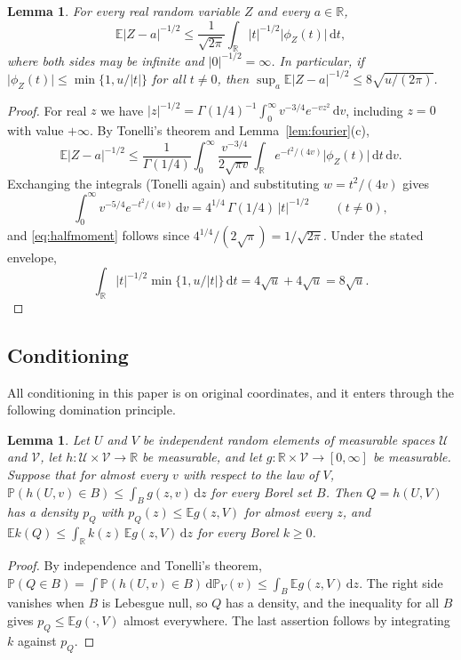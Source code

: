 \documentclass[11pt]{amsart}
\numberwithin{equation}{section}
\newtheorem{lemma}[theorem]{Lemma}
\theoremstyle{definition}
\theoremstyle{remark}
\newcommand{\R}{\mathbb R}
\newcommand{\E}{\mathbb E}
\newcommand{\PP}{\mathbb P}
\newcommand{\1}{\mathbf 1}
\newcommand{\dd}{\,\mathrm d}
\newcommand{\abs}[1]{\lvert #1\rvert}
\begin{document}
\begin{lemma}\label{lem:halfmoment}
For every real random variable $Z$ and every $a\in\R$,
\begin{equation}\label{eq:halfmoment}
\E\abs{Z-a}^{-1/2}\le\frac1{\sqrt{2\pi}}\int_\R\abs t^{-1/2}\abs{\phi_Z(t)}\dd t,
\end{equation}
where both sides may be infinite and $\abs0^{-1/2}=\infty$. In particular, if $\abs{\phi_Z(t)}\le\min\{1,u/\abs t\}$ for all $t\ne0$, then $\sup_a\E\abs{Z-a}^{-1/2}\le8\sqrt{u/(2\pi)}$.
\end{lemma}

\begin{proof}
For real $z$ we have $\abs z^{-1/2}=\Gamma(1/4)^{-1}\int_0^\infty v^{-3/4}e^{-vz^2}\dd v$, including $z=0$ with value $+\infty$. By Tonelli's theorem and Lemma~\ref{lem:fourier}(c),
\[
\E\abs{Z-a}^{-1/2}\le\frac{1}{\Gamma(1/4)}\int_0^\infty\frac{v^{-3/4}}{2\sqrt{\pi v}}\int_\R e^{-t^2/(4v)}\abs{\phi_Z(t)}\dd t\dd v .
\]
Exchanging the integrals (Tonelli again) and substituting $w=t^2/(4v)$ gives
\[
\int_0^\infty v^{-5/4}e^{-t^2/(4v)}\dd v=4^{1/4}\,\Gamma(1/4)\,\abs t^{-1/2}\qquad(t\ne0),
\]
and \eqref{eq:halfmoment} follows since $4^{1/4}/(2\sqrt\pi)=1/\sqrt{2\pi}$. Under the stated envelope,
\[
\int_\R\abs t^{-1/2}\min\{1,u/\abs t\}\dd t=4\sqrt u+4\sqrt u=8\sqrt u .
\]
\end{proof}

\subsection{Conditioning}
All conditioning in this paper is on original coordinates, and it enters through the following domination principle.

\begin{lemma}\label{lem:condition}
Let $U$ and $V$ be independent random elements of measurable spaces $\mathcal U$ and $\mathcal V$, let $h:\mathcal U\times\mathcal V\to\R$ be measurable, and let $g:\R\times\mathcal V\to[0,\infty]$ be measurable. Suppose that for almost every $v$ with respect to the law of $V$, $\PP(h(U,v)\in B)\le\int_Bg(z,v)\dd z$ for every Borel set $B$. Then $Q=h(U,V)$ has a density $p_Q$ with $p_Q(z)\le\E g(z,V)$ for almost every $z$, and $\E k(Q)\le\int_\R k(z)\,\E g(z,V)\dd z$ for every Borel $k\ge0$.
\end{lemma}

\begin{proof}
By independence and Tonelli's theorem, $\PP(Q\in B)=\int\PP(h(U,v)\in B)\dd\PP_V(v)\le\int_B\E g(z,V)\dd z$. The right side vanishes when $B$ is Lebesgue null, so $Q$ has a density, and the inequality for all $B$ gives $p_Q\le\E g(\cdot,V)$ almost everywhere. The last assertion follows by integrating $k$ against $p_Q$.
\end{proof}
\end{document}
